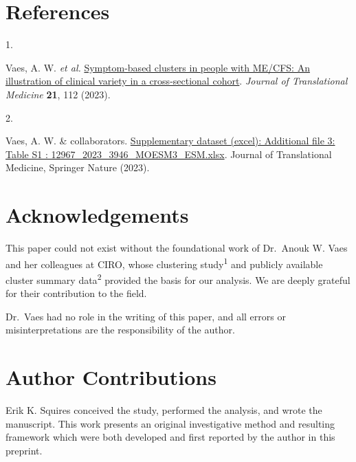\documentclass[
  letterpaper,
  DIV=11,
  numbers=noendperiod]{scrartcl}
\newlength{\cslhangindent}
\newlength{\csllabelwidth}
\newenvironment{CSLReferences}[2] %
 {\begin{list}{}{%
  \setlength{\itemindent}{0pt}
  \setlength{\leftmargin}{0pt}
  \setlength{\parsep}{0pt}
  \ifodd #1
   \setlength{\leftmargin}{\cslhangindent}
   \setlength{\itemindent}{-1\cslhangindent}
  \fi
  \setlength{\itemsep}{#2\baselineskip}}}
 {\end{list}}
\newcommand{\CSLLeftMargin}[1]{\parbox[t]{\csllabelwidth}{\strut#1\strut}}
\newcommand{\CSLRightInline}[1]{\parbox[t]{\linewidth - \csllabelwidth}{\strut#1\strut}}
\begin{document}
\FloatBarrier

\section*{References}\label{references}

\label{refs}
\begin{CSLReferences}{0}{0}
\CSLLeftMargin{1. }%
\CSLRightInline{Vaes, A. W. \emph{et al.}
\href{https://doi.org/10.1186/s12967-023-03946-6}{Symptom-based clusters
in people with ME/CFS: An illustration of clinical variety in a
cross-sectional cohort}. \emph{Journal of Translational Medicine}
\textbf{21}, 112 (2023).}

\CSLLeftMargin{2. }%
\CSLRightInline{Vaes, A. W. \& collaborators.
\href{https://static-content.springer.com/esm/art\%3A10.1186\%2Fs12967-023-03946-6/MediaObjects/12967_2023_3946_MOESM3_ESM.xlsx}{Supplementary
dataset (excel): Additional file 3: Table S1 :
12967\_2023\_3946\_MOESM3\_ESM.xlsx}. Journal of Translational Medicine,
Springer Nature (2023).}

\end{CSLReferences}

\newpage{}

\newpage{}

\section*{Acknowledgements}\label{acknowledgements}

This paper could not exist without the foundational work of Dr.~Anouk W.
Vaes and her colleagues at CIRO, whose clustering
study\textsuperscript{1} and publicly available cluster summary
data\textsuperscript{2} provided the basis for our analysis. We are
deeply grateful for their contribution to the field.

Dr.~Vaes had no role in the writing of this paper, and all errors or
misinterpretations are the responsibility of the author.

\section*{Author Contributions}\label{author-contributions}

Erik K. Squires conceived the study, performed the analysis, and wrote
the manuscript. This work presents an original investigative method and
resulting framework which were both developed and first reported by the
author in this preprint.
\end{document}
